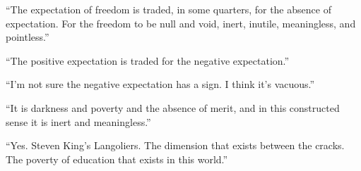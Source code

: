 

``The expectation of freedom is traded, in some quarters, for the
absence of expectation.  For the freedom to be null and void, inert,
inutile, meaningless, and pointless.''

``The positive expectation is traded for the negative expectation.''

``I'm not sure the negative expectation has a sign.  I think it's
vacuous.''

``It is darkness and poverty and the absence of \break merit, and in this
constructed sense it is inert and meaningless.''

``Yes.  Steven King's Langoliers.  The dimension that exists between
the cracks.  The poverty of education that exists in this world.''



\bye
